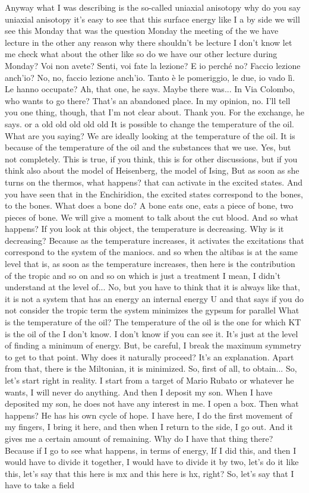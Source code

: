 Anyway what I was describing is the so-called uniaxial anisotopy why do you say uniaxial anisotopy it's easy to see that this surface energy like I a by side we will see this Monday that was the question Monday the meeting of the we have lecture in the other any reason why there shouldn't be lecture I don't know let me check what about the other like so do we have our other lecture during Monday? Voi non avete? Senti, voi fate la lezione? E io perché no? Faccio lezione anch'io? No, no, faccio lezione anch'io. Tanto è le pomeriggio, le due, io vado lì. Le hanno occupate? Ah, that one, he says. Maybe there was... In Via Colombo, who wants to go there? That's an abandoned place. In my opinion, no. I'll tell you one thing, though, that I'm not clear about. Thank you. For the exchange, he says. or a old old old old old It is possible to change the temperature of the oil. What are you saying? We are ideally looking at the temperature of the oil. It is because of the temperature of the oil and the substances that we use. Yes, but not completely. This is true, if you think, this is for other discussions, but if you think also about the model of Heisenberg, the model of Ising, But as soon as she turns on the thermos, what happens? that can activate in the excited states. And you have seen that in the Enchiridion, the excited states correspond to the bones, to the bones. What does a bone do? A bone eats one, eats a piece of bone, two pieces of bone. We will give a moment to talk about the cut blood. And so what happens? If you look at this object, the temperature is decreasing. Why is it decreasing? Because as the temperature increases, it activates the excitations that correspond to the system of the maniocs. and so when the altibas is at the same level that is, as soon as the temperature increases, then here is the contribution of the tropic and so on and so on which is just a treatment I mean, I didn't understand at the level of... No, but you have to think that it is always like that, it is not a system that has an energy an internal energy U and that says if you do not consider the tropic term the system minimizes the gypsum for parallel What is the temperature of the oil? The temperature of the oil is the one for which KT is the oil of the I don't know. I don't know if you can see it. It's just at the level of finding a minimum of energy. But, be careful, I break the maximum symmetry to get to that point. Why does it naturally proceed? It's an explanation. Apart from that, there is the Miltonian, it is minimized. So, first of all, to obtain... So, let's start right in reality. I start from a target of Mario Rubato or whatever he wants, I will never do anything. And then I deposit my son. When I have deposited my son, he does not have any interest in me. I open a box. Then what happens? He has his own cycle of hope. I have here, I do the first movement of my fingers, I bring it here, and then when I return to the side, I go out. And it gives me a certain amount of remaining. Why do I have that thing there? Because if I go to see what happens, in terms of energy, If I did this, and then I would have to divide it together, I would have to divide it by two, let's do it like this, let's say that this here is mx and this here is hx, right? So, let's say that I have to take a field 